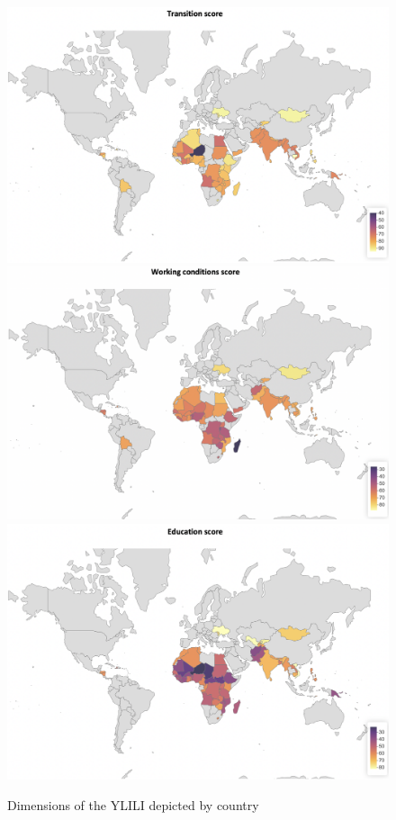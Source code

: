 \documentclass[
  a4paper, twoside, 12pt]{book}
\begin{document}
\begin{figure}[H]

{\centering \includegraphics[width=0.69\linewidth,]{figures/maps/transition_total} \includegraphics[width=0.69\linewidth,]{figures/maps/working_conditions_total} \includegraphics[width=0.69\linewidth,]{figures/maps/education_total} 

}

\caption{Dimensions of the YLILI depicted by country}\label{fig:fig-totalmap}
\end{figure}
\end{document}
